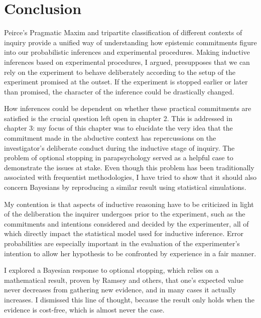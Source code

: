 \chapter{Conclusion}

Peirce's Pragmatic Maxim and tripartite classification of different contexts of inquiry provide a unified way of understanding how epistemic commitments figure into our probabilistic inferences and experimental procedures. Making inductive inferences based on experimental procedures, I argued, presupposes that we can rely on the experiment to behave deliberately according to the setup of the experiment promised at the outset. If the experiment is stopped earlier or later than promised, the character of the inference could be drastically changed. 

How inferences could be dependent on whether these practical commitments are satisfied is the crucial question left open in chapter 2. This is addressed in chapter 3: my focus of this chapter was to elucidate the very idea that the commitment made in the abductive context has repercussions on the investigator's deliberate conduct during the inductive stage of inquiry. The problem of optional stopping in parapsychology served as a helpful case to demonstrate the issues at stake. Even though this problem has been traditionally associated with frequentist methodologies, I have tried to show that it should also concern Bayesians by reproducing a similar result using statistical simulations. 

My contention is that aspects of inductive reasoning have to be criticized in light of the deliberation the inquirer undergoes prior to the experiment, such as the commitments and intentions considered and decided by the experimenter, all of which directly impact the statistical model used for inductive inference. Error probabilities are especially important in the evaluation of the experimenter's intention to allow her hypothesis to be confronted by experience in a fair manner.

 I explored a Bayesian response to optional stopping, which relies on a mathematical result, proven by Ramsey and others, that one's expected value never decreases from gathering new evidence, and in many cases it actually increases. I dismissed this line of thought, because the result only holds when the evidence is cost-free, which is almost never the case.
 
